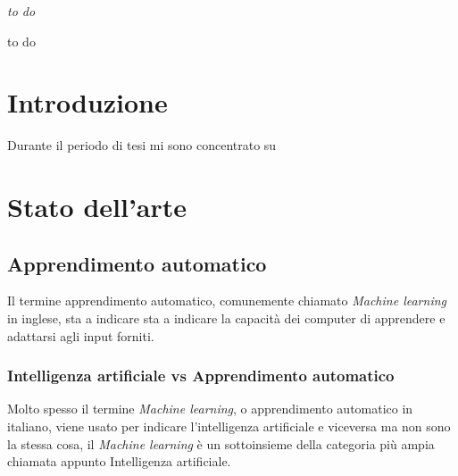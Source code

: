 \documentclass[12pt,italian]{report}
\begin{document}
	
	\frontespizio
	\beforepreface
	
	
	{\raggedleft \large \sl to do\\
		
	}
	
	
	
	
	
	
	
	to do
	
	
	\afterpreface
	
	
	
	\chapter*{Introduzione}
	\label{cap:introduzione}
	Durante il periodo di tesi mi sono concentrato su
	
	\chapter{Stato dell'arte}
	
	\section{Apprendimento automatico}
	Il termine apprendimento automatico, comunemente chiamato \textit{Machine learning} in inglese, sta a indicare sta a indicare la capacità dei computer di apprendere e adattarsi agli input forniti.
	\subsection{Intelligenza artificiale vs Apprendimento automatico}
	\label{machinelearning}
	Molto spesso il termine \textit{Machine learning}, o apprendimento automatico in italiano, viene usato per indicare l'intelligenza artificiale e viceversa ma non sono la stessa cosa, il \textit{Machine learning} è un sottoinsieme della categoria più ampia chiamata appunto Intelligenza artificiale.
 
\end{document}
